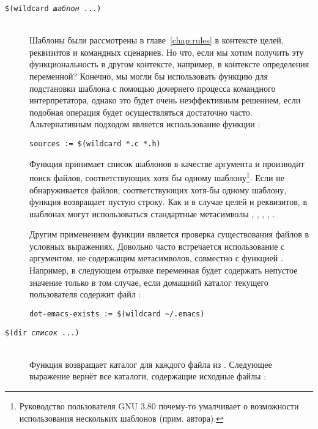 \begin{description}
\item[\texttt{\${}(wildcard \emph{шаблон} ...)}] \hfill \\
Шаблоны были рассмотрены в главе~\ref{chap:rules} в контексте целей,
реквизитов и командных сценариев. Но что, если мы хотим получить эту
функциональность в другом контексте, например, в контексте определения
переменной? Конечно, мы могли бы использовать функцию 
для подстановки шаблона с помощью дочернего процесса командного
интерпретатора, однако это будет очень неэффективным решением, если
подобная операция будет осуществляться достаточно часто.
Альтернативным подходом является использование функции
:

{\footnotesize
\begin{verbatim}
sources := $(wildcard *.c *.h)
\end{verbatim}
}

Функция  принимает список шаблонов в качестве
аргумента и производит поиск файлов, соответствующих хотя бы одному
шаблону\footnote{%
Руководство пользователя GNU \GNUmake{} 3.80 почему-то умалчивает о
возможности использования нескольких шаблонов (прим. автора).}.
Если не обнаруживается файлов, соответствующих хотя-бы одному
шаблону, функция возвращает пустую строку. Как и в случае целей и
реквизитов, в шаблонах могут использоваться стандартные метасимволы
\command{\~}, \command{*}, , \command{[...]},
\command{[\^\,...]}.

Другим применением функции  является проверка
существования файлов в условных выражениях. Довольно часто встречается
использование  с аргументом, не содержащим
метасимволов, совместно с функцией . Например, в
следующем отрывке переменная  будет
содержать непустое значение только в том случае, если домашний каталог
текущего пользователя содержит файл :

{\footnotesize
\begin{verbatim}
dot-emacs-exists := $(wildcard ~/.emacs)
\end{verbatim}
}

\item[\texttt{\${}(dir \emph{список} ...)}] \hfill \\
Функция  возвращает каталог для каждого файла из
. Следующее выражение вернёт все каталоги,
содержащие исходные файлы \Clang{}:


\end{description}
